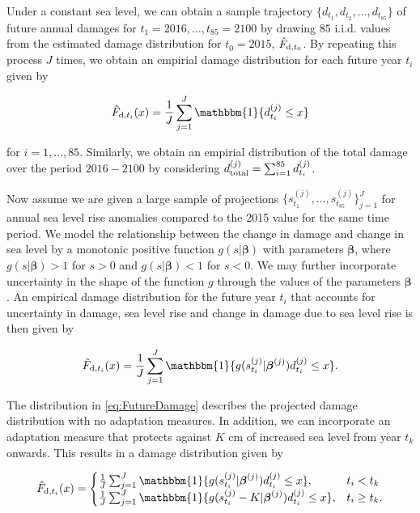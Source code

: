 \documentclass[draft,linenumbers]{agujournal}
\begin{document}
Under a constant sea level, we can obtain a sample trajectory $\{d_{t_1}, d_{t_2}, \ldots, d_{t_{85}}\}$ of future annual damages for $t_1 = 2016, \ldots, t_{85} = 2100$ by drawing $85$ i.i.d. values from the estimated damage distribution for $t_0 = 2015$, $\hat{F}_{\textup{d}, t_0}$.  By repeating this process $J$ times, we obtain an empirial damage distribution for each future year $t_i$ given by
\begin{linenomath*}
  \[
  \hat{F}_{\textup{d}, t_i} (x) = \frac{1}{J} \sum_{j=1}^J \mathbbm{1}\{d_{t_i}^{(j)} \leq x \}
  \]
\end{linenomath*}
for $i = 1, \ldots, 85$. Similarly, we obtain an empirial distribution of the total damage over the period $2016-2100$ by considering $d_{\textup{total}}^{(j)} = \sum_{i=1}^{85} d_{t_i}^{(j)}$.  

Now assume we are given a large sample of projections $\{s_{t_1}^{(j)}, \ldots, s_{t_{85}}^{(j)} \}_{j=1}^J$ for annual sea level rise anomalies compared to the 2015 value for the same time period. We model the relationship between the change in damage and change in sea level by a monotonic positive function $g(s| \boldsymbol \beta )$ with parameters $\boldsymbol \beta$, where $g(s|\boldsymbol \beta ) > 1$ for $s>0$ and $g(s|\boldsymbol \beta ) < 1$ for $s < 0$. We may further incorporate uncertainty in the shape of the function $g$ through the values of the parameters $\boldsymbol \beta$. An empirical damage distribution for the future year $t_i$ that accounts for uncertainty in damage, sea level rise and change in damage due to sea level rise is then given by
\begin{linenomath*}
  \begin{equation}\label{eq:FutureDamage}
    \hat{F}_{\textup{d}, t_i} (x) = \frac{1}{J} \sum_{j=1}^J \mathbbm{1}\{g(s_{t_i}^{(j)}| \boldsymbol \beta^{(j)}) d_{t_i}^{(j)} \leq x \}.
  \end{equation}
\end{linenomath*}

The distribution in \eqref{eq:FutureDamage} describes the projected damage distribution with no adaptation measures. In addition, we can incorporate an adaptation measure that protects against $K$ cm of increased sea level from year $t_k$ onwards. This results in a damage distribution given by
\begin{linenomath*}
  \[
  \hat{F}_{\textup{d}, t_i} (x) =
    \begin{cases}
      \frac{1}{J} \sum_{j=1}^J \mathbbm{1}\{g(s_{t_i}^{(j)}| \boldsymbol \beta^{(j)}) d_{t_i}^{(j)} \leq x \}, & t_i < t_k \\
      \frac{1}{J} \sum_{j=1}^J \mathbbm{1}\{g(s_{t_i}^{(j)} - K| \boldsymbol \beta^{(j)}) d_{t_i}^{(j)} \leq x \}, & t_i \geq t_k. \\
    \end{cases}
  \]
\end{linenomath*}
\end{document}
